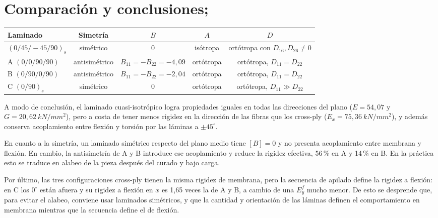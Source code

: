\documentclass[11pt,a4paper]{article}
\newcommand{\Eeq}{\si{kN/mm^2}}
\begin{document}
\section{Comparación y conclusiones;}

\begin{center}\small
\setlength{\tabcolsep}{3pt}
\begin{tabular}{lcccc}
\toprule
Laminado & Simetría & $B$ & $A$ & $D$ \\
\midrule
$(0/45/-45/90)_s$ & simétrico & $0$ & isótropa & ortótropa con $D_{16},D_{26}\neq0$ \\
A $(0/0/90/90)$ & antisimétrico & $B_{11}=-B_{22}=-4{,}09$ & ortótropa & ortótropa, $D_{11}{=}D_{22}$ \\
B $(0/90/0/90)$ & antisimétrico & $B_{11}=-B_{22}=-2{,}04$ & ortótropa & ortótropa, $D_{11}{=}D_{22}$ \\
C $(0/90)_s$ & simétrico & $0$ & ortótropa & ortótropa, $D_{11}\gg D_{22}$ \\
\bottomrule
\end{tabular}
\end{center}

A modo de conclusión, el laminado cuasi-isotrópico logra propiedades iguales en todas las direcciones del plano ($E=54{,}07$ y $G=20{,}62\ \Eeq$), pero a costa de tener menos rigidez en la dirección de las fibras que los cross-ply ($E_x=75{,}36\ \Eeq$), y además conserva acoplamiento entre flexión y torsión por las láminas a $\pm45^\circ$.

En cuanto a la simetría, un laminado simétrico respecto del plano medio tiene $[B]=0$ y no presenta acoplamiento entre membrana y flexión. En cambio, la antisimetría de A y B introduce ese acoplamiento y reduce la rigidez efectiva, 56\,\% en A y 14\,\% en B. En la práctica esto se traduce en alabeo de la pieza después del curado y bajo carga.

Por último, las tres configuraciones cross-ply tienen la misma rigidez de membrana, pero la secuencia de apilado define la rigidez a flexión: en C los $0^\circ$ están afuera y su rigidez a flexión en $x$ es 1,65 veces la de A y B, a cambio de una $E^f_y$ mucho menor. De esto se desprende que, para evitar el alabeo, conviene usar laminados simétricos, y que la cantidad y orientación de las láminas definen el comportamiento en membrana mientras que la secuencia define el de flexión.
\end{document}
